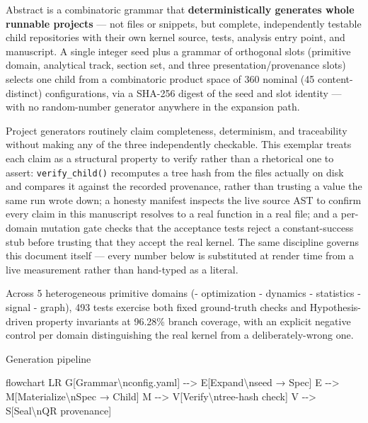 \documentclass[
  ignorenonframetext,
]{beamer}
\author{\texorpdfstring{}{}}
\date{}
\newenvironment{Shaded}{}{}
\newcommand{\NormalTok}[1]{#1}
\begin{document}
\begin{frame}{Abstract}
\protect{}\label{abstract}
 is a combinatoric grammar that
\textbf{deterministically generates whole runnable projects} --- not
files or snippets, but complete, independently testable child
repositories with their own kernel source, tests, analysis entry point,
and manuscript. A single integer seed plus a grammar of orthogonal slots
(primitive domain, analytical track, section set, and three
presentation/provenance slots) selects one child from a combinatoric
product space of 360 nominal (45 content-distinct) configurations, via a
SHA-256 digest of the seed and slot identity --- with no random-number
generator anywhere in the expansion path.

Project generators routinely claim completeness, determinism, and
traceability without making any of the three independently checkable.
This exemplar treats each claim as a structural property to verify
rather than a rhetorical one to assert: \texttt{verify\_child()}
recomputes a tree hash from the files actually on disk and compares it
against the recorded provenance, rather than trusting a value the same
run wrote down; a honesty manifest inspects the live source AST to
confirm every claim in this manuscript resolves to a real function in a
real file; and a per-domain mutation gate checks that the acceptance
tests reject a constant-success stub before trusting that they accept
the real kernel. The same discipline governs this document itself ---
every number below is substituted at render time from a live measurement
rather than hand-typed as a literal.

Across 5 heterogeneous primitive domains (- optimization - dynamics -
statistics - signal - graph), 493 tests exercise both fixed ground-truth
checks and Hypothesis-driven property invariants at 96.28\% branch
coverage, with an explicit negative control per domain distinguishing
the real kernel from a deliberately-wrong one.

\begin{block}{Generation pipeline}
\protect{}\label{generation-pipeline}
\begin{Shaded}
\begin{Highlighting}[]
\NormalTok{flowchart LR}
\NormalTok{    G[Grammar\textbackslash{}nconfig.yaml] {-}{-}\textgreater{} E[Expand\textbackslash{}nseed → Spec]}
\NormalTok{    E {-}{-}\textgreater{} M[Materialize\textbackslash{}nSpec → Child]}
\NormalTok{    M {-}{-}\textgreater{} V[Verify\textbackslash{}ntree{-}hash check]}
\NormalTok{    V {-}{-}\textgreater{} S[Seal\textbackslash{}nQR provenance]}
\end{Highlighting}
\end{Shaded}
\end{block}


\end{frame}
\end{document}
